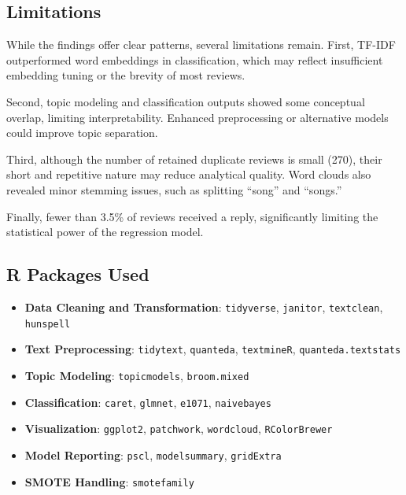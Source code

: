 \documentclass[
  11pt,
]{article}
\providecommand{\tightlist}{%
  \setlength{\itemsep}{0pt}\setlength{\parskip}{0pt}}
\begin{document}
\hypertarget{limitations}{%
\subsection{Limitations}\label{limitations}}

While the findings offer clear patterns, several limitations remain.
First, TF-IDF outperformed word embeddings in classification, which may
reflect insufficient embedding tuning or the brevity of most reviews.

Second, topic modeling and classification outputs showed some conceptual
overlap, limiting interpretability. Enhanced preprocessing or
alternative models could improve topic separation.

Third, although the number of retained duplicate reviews is small (270),
their short and repetitive nature may reduce analytical quality. Word
clouds also revealed minor stemming issues, such as splitting ``song''
and ``songs.''

Finally, fewer than 3.5\% of reviews received a reply, significantly
limiting the statistical power of the regression model.

\hypertarget{r-packages-used}{%
\subsection{R Packages Used}\label{r-packages-used}}

\begin{itemize}
\tightlist
\item
  \textbf{Data Cleaning and Transformation}: \texttt{tidyverse},
  \texttt{janitor}, \texttt{textclean}, \texttt{hunspell}\\
\item
  \textbf{Text Preprocessing}: \texttt{tidytext}, \texttt{quanteda},
  \texttt{textmineR}, \texttt{quanteda.textstats}\\
\item
  \textbf{Topic Modeling}: \texttt{topicmodels}, \texttt{broom.mixed}\\
\item
  \textbf{Classification}: \texttt{caret}, \texttt{glmnet},
  \texttt{e1071}, \texttt{naivebayes}\\
\item
  \textbf{Visualization}: \texttt{ggplot2}, \texttt{patchwork},
  \texttt{wordcloud}, \texttt{RColorBrewer}\\
\item
  \textbf{Model Reporting}: \texttt{pscl}, \texttt{modelsummary},
  \texttt{gridExtra}\\
\item
  \textbf{SMOTE Handling}: \texttt{smotefamily}
\end{itemize}
\end{document}
